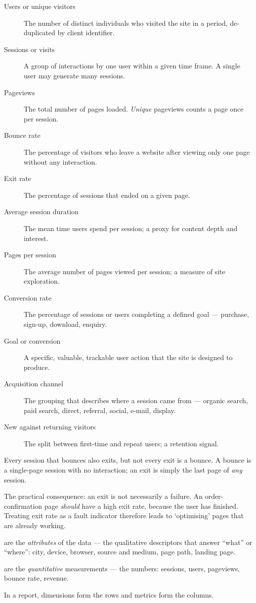 \documentclass{MMTextbook}
\begin{document}
\begin{description}
\item[Users or unique visitors] The number of distinct individuals who visited
the site in a period, de-duplicated by client identifier.
\item[Sessions or visits] A group of interactions by one user within a given time
frame. A single user may generate many sessions.
\item[Pageviews] The total number of pages loaded. \emph{Unique} pageviews counts
a page once per session.
\item[Bounce rate] The percentage of visitors who leave a website after viewing
only one page without any interaction.
\item[Exit rate] The percentage of sessions that ended on a given page.
\item[Average session duration] The mean time users spend per session; a proxy
for content depth and interest.
\item[Pages per session] The average number of pages viewed per session; a
measure of site exploration.
\item[Conversion rate] The percentage of sessions or users completing a defined
goal --- purchase, sign-up, download, enquiry.
\item[Goal or conversion] A specific, valuable, trackable user action that the
site is designed to produce.
\item[Acquisition channel] The grouping that describes where a session came from
--- organic search, paid search, direct, referral, social, e-mail, display.
\item[New against returning visitors] The split between first-time and repeat
users; a retention signal.
\end{description}

\begin{warnbox}
Every session that bounces also exits, but not every exit is a bounce. A bounce
is a single-page session with no interaction; an exit is simply the last page of
\emph{any} session.

\smallskip
The practical consequence: an exit is not necessarily a failure. An
order-confirmation page \emph{should} have a high exit rate, because the user has
finished. Treating exit rate as a fault indicator therefore leads to
`optimising' pages that are already working.
\end{warnbox}

\begin{definitionbox}
 are the \emph{attributes} of the data --- the
qualitative descriptors that answer ``what'' or ``where'': city, device, browser,
source and medium, page path, landing page.

 are the \emph{quantitative} measurements --- the
numbers: sessions, users, pageviews, bounce rate, revenue.

\smallskip
In a report, dimensions form the rows and metrics form the columns.
\end{definitionbox}
\end{document}

